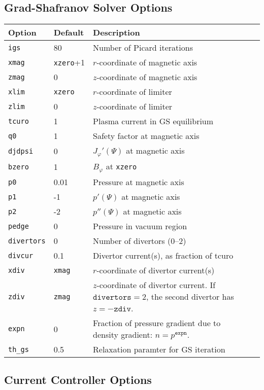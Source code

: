 \documentclass[draft]{book}
\newcommand{\tor}{\varphi}              %
\begin{document}
\subsection{Grad-Shafranov Solver Options}
\begin{tabular}{llll}
  \textbf{Option}&\textbf{Default}&\textbf{Description}\\
  \hline
  \texttt{igs}   & 80     & Number of Picard iterations\\
  \texttt{xmag}  & \texttt{xzero}+1 & $r$-coordinate of magnetic axis\\
  \texttt{zmag}  & 0      & $z$-coordinate of magnetic axis\\
  \texttt{xlim}  & \texttt{xzero}   & $r$-coordinate of limiter\\
  \texttt{zlim}  & 0      & $z$-coordinate of limiter\\
  \texttt{tcuro} & 1      & Plasma current in GS equilibrium\\
  \texttt{q0}    & 1      & Safety factor at magnetic axis\\
  \texttt{djdpsi}& 0      & $J_\tor'(\Psi)$ at magnetic axis\\
  \texttt{bzero} & 1      & $B_\tor$ at \texttt{xzero}\\
  \texttt{p0}    & 0.01   & Pressure at magnetic axis\\
  \texttt{p1}    & -1     & $p'(\Psi)$ at magnetic axis\\
  \texttt{p2}    & -2     & $p''(\Psi)$ at magnetic axis\\
  \texttt{pedge} & 0      & Pressure in vacuum region\\
  \texttt{divertors} & 0  & Number of divertors (0--2)\\
  \texttt{divcur}& 0.1    & Divertor current(s), as fraction of tcuro\\
  \texttt{xdiv}  & \texttt{xmag} & $r$-coordinate of divertor current(s)\\
  \texttt{zdiv}  & \texttt{zmag} & \parbox[t]{3in}{$z$-coordinate of 
    divertor 
    current.  If $\mathtt{divertors} = 2$, the second divertor has 
    $z = -\mathtt{zdiv}$.}\\
  \texttt{expn}  & 0 & \parbox[t]{3in}{Fraction of pressure gradient due to
    density gradient: $n = p^\mathtt{expn}$.}\\
  \texttt{th\_gs} & 0.5 & Relaxation paramter for GS iteration
\end{tabular}


\subsection{Current Controller Options}
\end{document}
